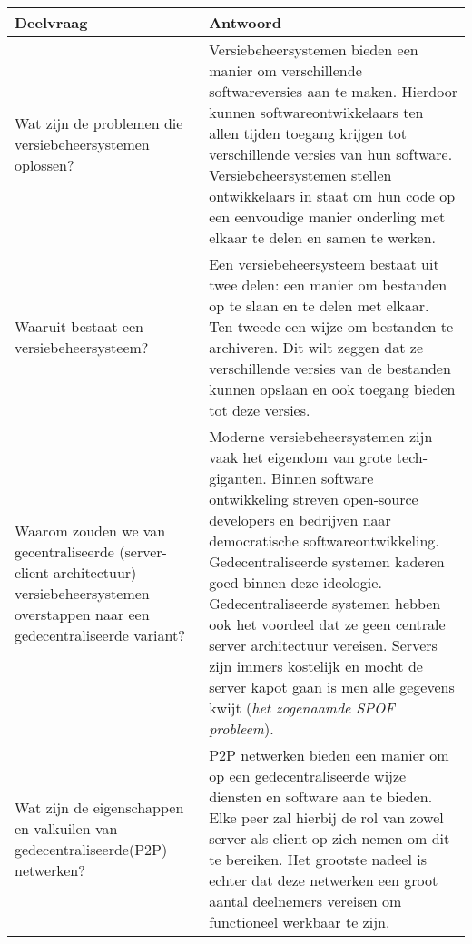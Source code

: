 \begin{table}[h!]
\begin{tabularx}{\linewidth}{ |X|X| }
\hline
Deelvraag & Antwoord \\ \hline
Wat zijn de problemen die versiebeheersystemen oplossen? & 
Versiebeheersystemen bieden een manier om verschillende softwareversies aan te maken. Hierdoor kunnen softwareontwikkelaars ten allen tijden toegang krijgen tot verschillende versies van hun software. Versiebeheersystemen stellen ontwikkelaars in staat om hun code op een eenvoudige manier onderling met elkaar te delen en samen te werken.\\ \hline
Waaruit bestaat een versiebeheersysteem? & Een versiebeheersysteem bestaat uit twee delen: een manier om bestanden op te slaan en te delen met elkaar. Ten tweede een wijze om bestanden te archiveren. Dit wilt zeggen dat ze verschillende versies van de bestanden kunnen opslaan en ook toegang bieden tot deze versies.\\ \hline
Waarom zouden we van gecentraliseerde (server-client architectuur) versiebeheersystemen overstappen naar een gedecentraliseerde variant?         & Moderne versiebeheersystemen zijn vaak het eigendom van grote tech-giganten. Binnen software ontwikkeling streven open-source developers en bedrijven naar democratische softwareontwikkeling. Gedecentraliseerde systemen kaderen goed binnen deze ideologie. Gedecentraliseerde systemen hebben ook het voordeel dat ze geen centrale server architectuur vereisen. Servers zijn immers kostelijk en mocht de server kapot gaan is men alle gegevens kwijt (\textit{het zogenaamde SPOF probleem}).\\ \hline
Wat zijn de eigenschappen en valkuilen van gedecentraliseerde(P2P) netwerken? & P2P netwerken bieden een manier om op een gedecentraliseerde wijze diensten en software aan te bieden. Elke peer zal hierbij de rol van zowel server als client op zich nemen om dit te bereiken. Het grootste nadeel is echter dat deze netwerken een groot aantal deelnemers vereisen om functioneel werkbaar te zijn.\\ \hline
\end{tabularx}
\end{table} 
\newpage
